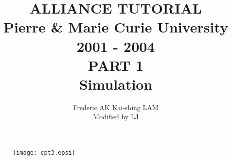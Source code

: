 \documentclass{article}
\begin{document}
\title{
                    {\Huge ALLIANCE TUTORIAL\\}
	 {\large
               Pierre \& Marie Curie University \\
                    2001 - 2004\\
    }
    \vspace{1cm}
    {\huge
                      PART 1\\
                Simulation
    }
}
\date{}
      
\author{Frederic AK \hspace{2cm}  Kai-shing LAM\\
Modified by LJ
}

\maketitle

\begin{figure}[H]\centering
  \texttt{[image: cpt3.epsi]}
\end{figure}

\begin{figure}
\end{figure}

\thispagestyle{empty}
\def\myfbox#1{\vspace*{3mm}\fbox{#1}\vspace{3mm}}

        \vspace{3cm}
\end{document}
